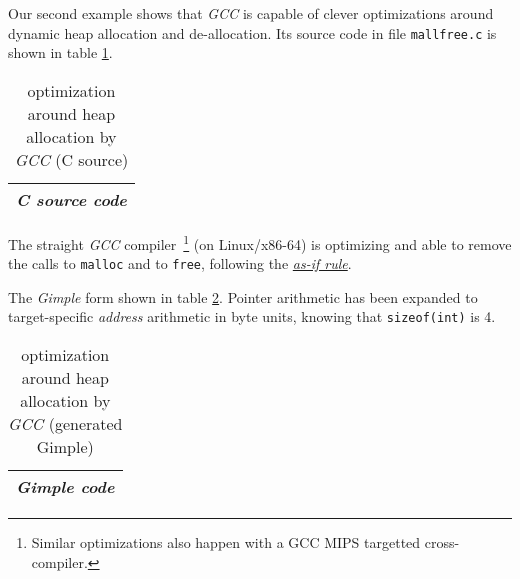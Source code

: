 \bigskip

Our second example shows that \emph{GCC} is capable of clever
optimizations around dynamic heap allocation and de-allocation. Its
source code in file \texttt{mallfree.c} is shown in table
\ref{tab:mallfreecsrc}.

\begin{table}[!htbp]
\caption{\label{tab:mallfreecsrc} optimization around heap allocation by \emph{GCC} (C source)}
   \medskip
  \begin{center}
    \begin{relsize}{-1.2}
     \begin{tabular}{c}
       \\ 
       \textbf{\emph{C source code}} \\ 
       \hline
     \end{tabular}
    \end{relsize}
  \end{center}
\end{table}

 The straight \emph{GCC} compiler~\footnote{Similar optimizations also
   happen with a GCC MIPS targetted cross-compiler.} (on Linux/x86-64)
 is optimizing and able to remove the calls to \texttt{malloc} and to
 \texttt{free}, following the  \href{https://en.wikipedia.org/wiki/As-if\_rule}{\emph{as-if rule}}.


The \emph{Gimple} form shown in table
\ref{tab:mallfreegimple}. Pointer arithmetic has been expanded to
target-specific \emph{address} arithmetic in byte units, knowing that
\texttt{sizeof(int)} is 4.



 \smallskip

\begin{table}[H]
\caption{\label{tab:mallfreegimple} optimization around heap
  allocation by \emph{GCC} (generated Gimple)}
   \medskip
  \begin{center}
    \begin{relsize}{-1.5}
     \begin{tabular}{c}
       \\ 
       \textbf{\emph{Gimple code}} \\ 
       \hline
     \end{tabular}
    \end{relsize}
  \end{center}
\end{table}

